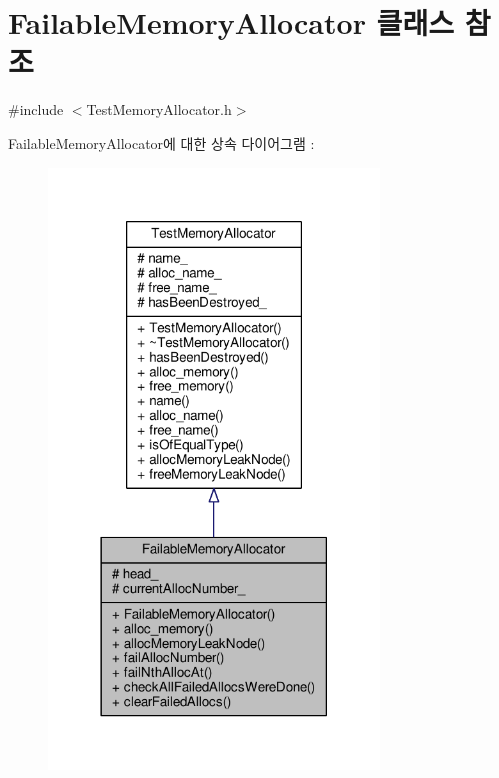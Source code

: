 \hypertarget{class_failable_memory_allocator}{}\section{Failable\+Memory\+Allocator 클래스 참조}
\label{class_failable_memory_allocator}


{\ttfamily \#include $<$Test\+Memory\+Allocator.\+h$>$}



Failable\+Memory\+Allocator에 대한 상속 다이어그램 \+: 
\nopagebreak
\begin{figure}[H]
\begin{center}
\leavevmode
\includegraphics[width=249pt]{class_failable_memory_allocator__inherit__graph}
\end{center}
\end{figure}


